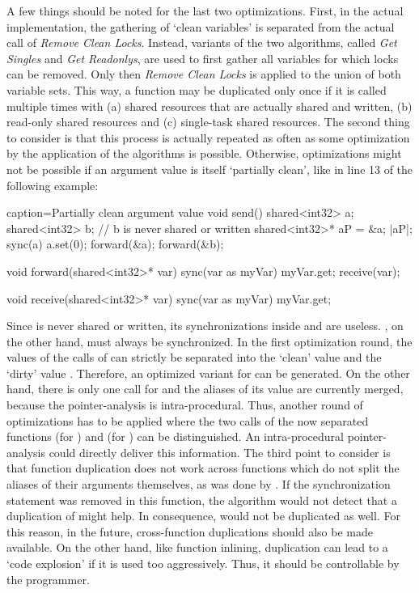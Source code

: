 A few things should be noted for the last two optimizations. First, in the actual implementation, the gathering of `clean variables' is separated from the actual call of \textit{Remove Clean Locks}. Instead, variants of the two algorithms, called \textit{Get Singles} and \textit{Get Readonlys}, are used to first gather all variables for which locks can be removed. Only then \textit{Remove Clean Locks} is applied to the union of both variable sets. This way, a function may be duplicated only once if it is called multiple times with (a) shared resources that are actually shared and written, (b) read-only shared resources and (c) single-task shared resources. The second thing to consider is that this process is actually repeated as often as some optimization by the application of the algorithms is possible. Otherwise, optimizations might not be possible if an argument value is itself `partially clean', like  in line 13 of the following example:

\begin{ccode}{caption=Partially clean argument value}
void send() {
  shared<int32> a;
  shared<int32> b;          // b is never shared or written
  shared<int32>* aP = &a;
  |aP|;
  sync(a) { a.set(0); }
  forward(&a);
  forward(&b);
}

void forward(shared<int32>* var) {
  sync(var as myVar) { myVar.get; }
  receive(var);
}

void receive(shared<int32>* var) {
  sync(var as myVar) { myVar.get; }
}
\end{ccode} 

Since  is never shared or written, its synchronizations inside  and  are useless. , on the other hand, must always be synchronized. In the first optimization round, the values of the calls of  can strictly be separated into the `clean' value  and the `dirty' value . Therefore, an optimized variant for  can be generated. On the other hand, there is only one call for  and the aliases of its value are currently merged, because the pointer-analysis is intra-procedural. Thus, another round of optimizations has to be applied where the two calls of the now separated functions  (for ) and  (for ) can be distinguished. An intra-procedural pointer-analysis could directly deliver this information. The third point to consider is that function duplication does not work across functions which do not split the aliases of their arguments themselves, as was done by . If the synchronization statement was removed in this function, the algorithm would not detect that a duplication of  might help. In consequence,  would not be duplicated as well. For this reason, in the future, cross-function duplications should also be made available. On the other hand, like function inlining, duplication can lead to a `code explosion' if it is used too aggressively. Thus, it should be controllable by the programmer.

